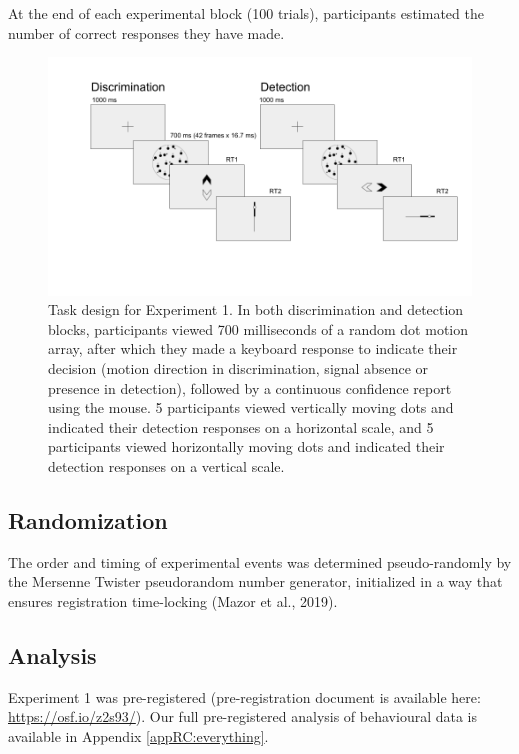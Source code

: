\documentclass[12pt,twoside]{reedthesis}
\begin{document}
At the end of each experimental block (100 trials), participants estimated the number of correct responses they have made.
\begin{figure}
\includegraphics[width=\textwidth]{figure/RC/designExp1} \caption[Experimental design for Exp. 1]{Task design for Experiment 1. In both discrimination and detection blocks, participants viewed 700 milliseconds of a random dot motion array, after which they made a keyboard response to indicate their decision (motion direction in discrimination, signal absence or presence in detection), followed by a continuous confidence report using the mouse. 5 participants viewed vertically moving dots and indicated their detection responses on a horizontal scale, and 5 participants viewed horizontally moving dots and indicated their detection responses on a vertical scale. }\label{fig:RC-exp1-design}
\end{figure}
\hypertarget{randomization-1}{%
\subsection{Randomization}\label{randomization-1}}

The order and timing of experimental events was determined pseudo-randomly by the Mersenne Twister pseudorandom number generator, initialized in a way that ensures registration time-locking (Mazor et al., 2019).

\hypertarget{analysis}{%
\subsection{Analysis}\label{analysis}}

Experiment 1 was pre-registered (pre-registration document is available here: \url{https://osf.io/z2s93/}). Our full pre-registered analysis of behavioural data is available in Appendix \ref{appRC:everything}.
\end{document}
